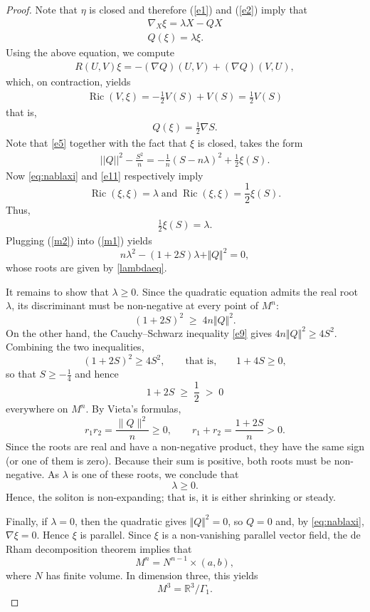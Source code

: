 \documentclass[a4paper, twoside, 10pt]{article}
\numberwithin{equation}{section}
\theoremstyle{definition}
\begin{document}
\begin{proof}
Note that $\eta$ is closed and therefore (\ref{e1})
and (\ref{e2}) imply that
\begin{eqnarray}\label{eq:nablaxi}
\nabla_{X} \xi = \lambda X - Q X \\ \nonumber
Q(\xi) = \lambda \xi.
\end{eqnarray}
Using the above equation, we compute
\begin{eqnarray}\label{curv}
R(U,V)\xi = - (\nabla Q)(U,V) + (\nabla Q)(V,U),
\end{eqnarray}
which, on contraction, yields
\begin{eqnarray}\label{e11}
\operatorname{Ric}(V,\xi)  = -\frac{1}{2} V(S) + V(S) =  \frac{1}{2} V(S)
\end{eqnarray}
that is,
\begin{eqnarray}\label{Qxi}
Q(\xi) = \frac{1}{2} \nabla S.
\end{eqnarray}
Note that \eqref{e5} together with the fact that
$\xi$ is closed, takes the form
\begin{eqnarray}\label{m1}
||Q||^2 - \frac{S^2}{n}  =
- \frac{1}{n} \left(S - n \lambda \right)^2 + \frac{1}{2}
\xi(S).
\end{eqnarray}
Now \eqref{eq:nablaxi} and \eqref{e11} respectively imply
$$\operatorname{Ric}(\xi, \xi) = \lambda \;\mbox{and} \;
\operatorname{Ric}(\xi, \xi) = \frac{1}{2} \xi(S).$$
Thus,
\begin{eqnarray}\label{m2}
\frac{1}{2} \xi(S) = \lambda.
\end{eqnarray}
Plugging (\ref{m2}) into (\ref{m1}) yields
\[
n\lambda^{2}-(1+2S)\lambda+\Vert Q\Vert^{2}=0 ,
\]
whose roots are given by \eqref{lambdaeq}.

It remains to show that $\lambda\geq0$. Since the quadratic equation admits the real root $\lambda$,
its discriminant must be non-negative at every point of $M^n$:
\[
(1+2S)^{2}\;\geq\;4n\Vert Q\Vert^{2}.
\]
On the other hand, the Cauchy--Schwarz inequality \eqref{e9} gives
$4n\Vert Q\Vert^{2}\geq 4S^{2}$. Combining the two inequalities,
\[
(1+2S)^{2}\geq 4S^{2},
\qquad\text{that is,}\qquad
1+4S\geq0 ,
\]
so that $S\geq-\frac14$ and hence
\[
1+2S\;\geq\;\frac12\;>\;0
\]
everywhere on $M^{n}$. By Vieta's formulas,
\[
r_1r_2=\frac{\|Q\|^2}{n}\ge0,
\qquad
r_1+r_2=\frac{1+2S}{n}>0.
\]
Since the roots are real and have a non-negative product,
they have the same sign (or one of them is zero). Because
their sum is positive, both roots must be non-negative.
As $\lambda$ is one of these roots, we conclude that
\[
\lambda\ge0.
\]
Hence, the soliton is non-expanding; that is, it is either shrinking or steady.

Finally, if $\lambda=0$, then the quadratic gives
$\Vert Q\Vert^{2}=0$, so $Q=0$ and, by \eqref{eq:nablaxi}, $\nabla\xi=0$.
Hence $\xi$ is parallel. Since $\xi$ is a non-vanishing parallel vector
field, the de Rham decomposition theorem implies that
\[
M^n=N^{n-1}\times(a,b),
\]
where $N$ has finite volume. In dimension three, this yields
\[
M^3=\mathbb{R}^3/\Gamma_1 .
\]
\end{proof}
\end{document}
